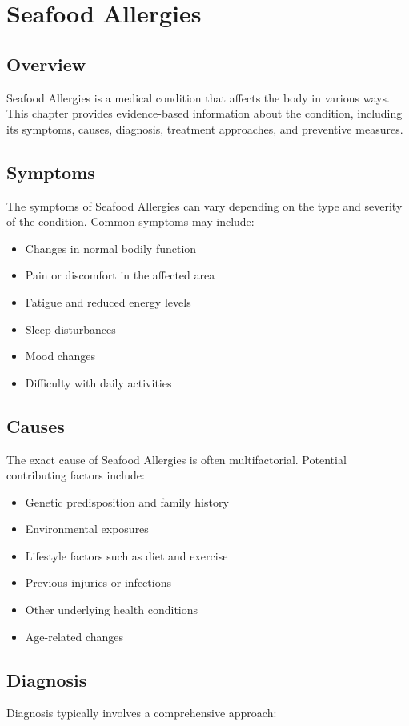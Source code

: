 \chapter{Seafood Allergies}

\section*{Overview}
Seafood Allergies is a medical condition that affects the body in various ways. This chapter provides evidence-based information about the condition, including its symptoms, causes, diagnosis, treatment approaches, and preventive measures.

\section*{Symptoms}
The symptoms of Seafood Allergies can vary depending on the type and severity of the condition. Common symptoms may include:

\begin{itemize}
\item Changes in normal bodily function
\item Pain or discomfort in the affected area
\item Fatigue and reduced energy levels
\item Sleep disturbances
\item Mood changes
\item Difficulty with daily activities
\end{itemize}

\section*{Causes}
The exact cause of Seafood Allergies is often multifactorial. Potential contributing factors include:

\begin{itemize}
\item Genetic predisposition and family history
\item Environmental exposures
\item Lifestyle factors such as diet and exercise
\item Previous injuries or infections
\item Other underlying health conditions
\item Age-related changes
\end{itemize}

\section*{Diagnosis}
Diagnosis typically involves a comprehensive approach:

